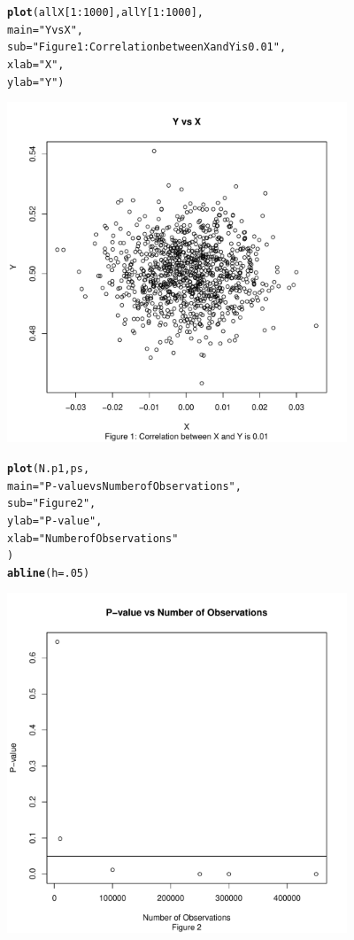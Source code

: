 \documentclass{article}\usepackage[]{graphicx}\usepackage[]{color}
\makeatletter
\newcommand{\hlnum}[1]{\textcolor[rgb]{0.686,0.059,0.569}{#1}}%
\newcommand{\hlstr}[1]{\textcolor[rgb]{0.192,0.494,0.8}{#1}}%
\newcommand{\hlopt}[1]{\textcolor[rgb]{0,0,0}{#1}}%
\newcommand{\hlstd}[1]{\textcolor[rgb]{0.345,0.345,0.345}{#1}}%
\newcommand{\hlkwc}[1]{\textcolor[rgb]{0.333,0.667,0.333}{#1}}%
\newcommand{\hlkwd}[1]{\textcolor[rgb]{0.737,0.353,0.396}{\textbf{#1}}}%
\newenvironment{kframe}{%
 \def\at@end@of@kframe{}%
 \ifinner\ifhmode%
  \def\at@end@of@kframe{\end{minipage}}%
  \begin{minipage}{\columnwidth}%
 \fi\fi%
 \def\FrameCommand##1{\hskip\@totalleftmargin \hskip-\fboxsep
 \colorbox{shadecolor}{##1}\hskip-\fboxsep
     \hskip-\linewidth \hskip-\@totalleftmargin \hskip\columnwidth}%
 \MakeFramed {\advance\hsize-\width
   \@totalleftmargin\z@ \linewidth\hsize
   \@setminipage}}%
 {\par\unskip\endMakeFramed%
 \at@end@of@kframe}
\newenvironment{knitrout}{}{} %
\makeatother
\begin{document}
\begin{center}
\begin{knitrout}
\color{fgcolor}\begin{kframe}
\begin{alltt}
\hlkwd{plot}\hlstd{(allX[}\hlnum{1}\hlopt{:}\hlnum{1000}\hlstd{], allY[}\hlnum{1}\hlopt{:}\hlnum{1000}\hlstd{],}
     \hlkwc{main} \hlstd{=} \hlstr{"Y vs X"}\hlstd{,}
     \hlkwc{sub} \hlstd{=} \hlstr{"Figure 1: Correlation between X and Y is 0.01"}\hlstd{,}
     \hlkwc{xlab} \hlstd{=} \hlstr{"X"}\hlstd{,}
     \hlkwc{ylab} \hlstd{=} \hlstr{"Y"}\hlstd{)}
\end{alltt}
\end{kframe}
\includegraphics[width=4in]{figure/p1Plot-1} 
\begin{kframe}\begin{alltt}
\hlkwd{plot}\hlstd{(N.p1, ps,}
     \hlkwc{main} \hlstd{=} \hlstr{"P-value vs Number of Observations"}\hlstd{,}
     \hlkwc{sub} \hlstd{=} \hlstr{"Figure 2"}\hlstd{,}
     \hlkwc{ylab} \hlstd{=} \hlstr{"P-value"}\hlstd{,}
     \hlkwc{xlab} \hlstd{=} \hlstr{"Number of Observations"}
\hlstd{)}
\hlkwd{abline}\hlstd{(}\hlkwc{h} \hlstd{=} \hlnum{.05}\hlstd{)}
\end{alltt}
\end{kframe}
\includegraphics[width=4in]{figure/p1Plot-2} 


\end{knitrout}
\end{center}
\end{document}
